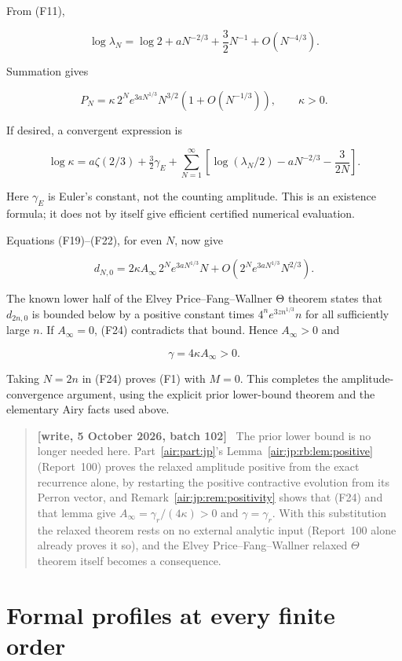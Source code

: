 \documentclass[11pt,letterpaper]{article}
\numberwithin{equation}{section}
\theoremstyle{remark}
\newenvironment{writenotejp}{\par\smallskip\begin{quote}\small\textbf{[write, 5 October 2026, batch 102]}\ }{\end{quote}\smallskip}
\begin{document}
From (F11),

\[
\log\lambda_N=\log2+aN^{-2/3}+\frac32N^{-1}+O(N^{-4/3}).
\]

Summation gives

\[
P_N=\kappa\,2^N e^{3aN^{1/3}}N^{3/2}(1+O(N^{-1/3})),
\qquad \kappa>0.
\tag{F22}
\]

If desired, a convergent expression is

\[
\log\kappa=a\zeta(2/3)+\tfrac32\gamma_E
+\sum_{N=1}^\infty\left[
\log(\lambda_N/2)-aN^{-2/3}-\frac{3}{2N}\right].
\tag{F23}
\]

Here \(\gamma _E\) is Euler's constant, not the counting amplitude. This is an existence formula; it does not by itself give efficient certified numerical evaluation.

Equations (F19)--(F22), for even \(N\), now give

\[
d_{N,0}=2\kappa A_\infty\,2^N e^{3aN^{1/3}}N
+O\left(2^N e^{3aN^{1/3}}N^{2/3}\right).
\tag{F24}
\]

The known lower half of the Elvey Price--Fang--Wallner Θ theorem states that \(d_{2n,0}\) is bounded below by a positive constant times \(4^n e^{3zn^{1/3}}n\) for all sufficiently large \(n\). If \(A_\infty =0\), (F24) contradicts that bound. Hence \(A_\infty >0\) and

\[
\gamma=4\kappa A_\infty>0.
\tag{F25}
\]

Taking \(N=2n\) in (F24) proves (F1) with \(M=0\). This completes the amplitude-convergence argument, using the explicit prior lower-bound theorem and the elementary Airy facts used above.
\begin{writenotejp}
The prior lower bound is no longer needed here. Part~\ref{air:part:jp}'s Lemma~\ref{air:jp:rb:lem:positive} (Report~100) proves the relaxed amplitude positive from the exact recurrence alone, by restarting the positive contractive evolution from its Perron vector, and Remark~\ref{air:jp:rem:positivity} shows that (F24) and that lemma give $A_\infty=\gamma_r/(4\kappa)>0$ and $\gamma=\gamma_r$. With this substitution the relaxed theorem rests on no external analytic input (Report~100 alone already proves it so), and the Elvey Price--Fang--Wallner relaxed $\Theta$ theorem itself becomes a consequence.
\end{writenotejp}

\section{Formal profiles at every finite order}\label{air:rb:formal-profiles-at-every-finite-order}
\end{document}
